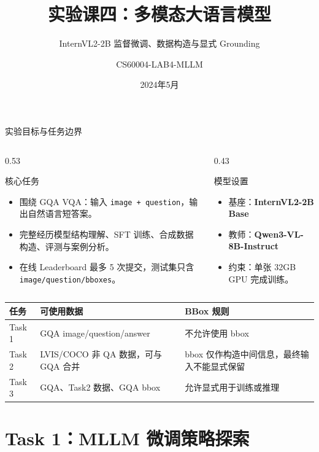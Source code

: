 \documentclass{beamer}
\title{实验课四：多模态大语言模型}
\subtitle{InternVL2-2B 监督微调、数据构造与显式 Grounding}
\author{CS60004-LAB4-MLLM}
\date{2024年5月}
\newcommand{\smalltab}{\scriptsize}
\begin{document}
\maketitle

\begin{frame}[shrink=4]{实验目标与任务边界}
\small
\begin{columns}[T,onlytextwidth]
\begin{column}{0.53\textwidth}
\begin{block}{核心任务}
\begin{itemize}
\item 围绕 GQA VQA：输入 \texttt{image + question}，输出自然语言短答案。
\item 完整经历模型结构理解、SFT 训练、合成数据构造、评测与案例分析。
\item 在线 Leaderboard 最多 5 次提交，测试集只含 \texttt{image/question/bboxes}。
\end{itemize}
\end{block}
\end{column}
\begin{column}{0.43\textwidth}
\begin{block}{模型设置}
\begin{itemize}
\item 基座：\textbf{InternVL2-2B Base}
\item 教师：\textbf{Qwen3-VL-8B-Instruct}
\item 约束：单张 32GB GPU 完成训练。
\end{itemize}
\end{block}
\end{column}
\end{columns}
\vspace{0.3em}
\begin{center}
\smalltab
\begin{tabular}{p{}p{}p{}}
\toprule
任务 & 可使用数据 & BBox 规则 \\
\midrule
Task 1 & GQA image/question/answer & 不允许使用 bbox \\
Task 2 & LVIS/COCO 非 QA 数据，可与 GQA 合并 & bbox 仅作构造中间信息，最终输入不能显式保留 \\
Task 3 & GQA、Task2 数据、GQA bbox & 允许显式用于训练或推理 \\
\bottomrule
\end{tabular}
\end{center}
\end{frame}

\section{Task 1：MLLM 微调策略探索}
\end{document}

